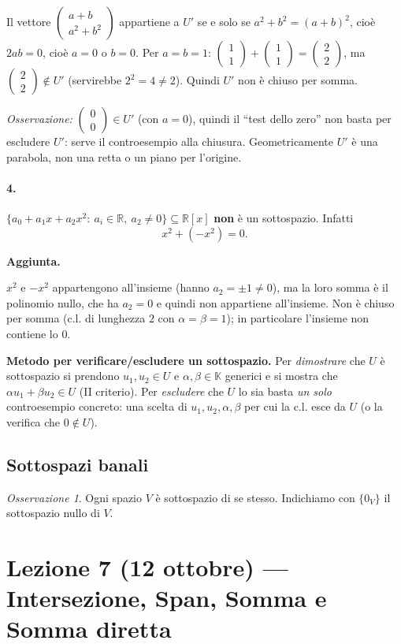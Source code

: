 \documentclass[11pt,a4paper]{article}
\newcommand{\RR}{\mathbb{R}}
\newcommand{\KK}{\mathbb{K}}
\newcommand{\vect}[2]{\begin{pmatrix}#1\\#2\end{pmatrix}}
\theoremstyle{plain}
\theoremstyle{definition}
\theoremstyle{remark}
\newtheorem{oss}[prop]{Osservazione}
\begin{document}
Il vettore $\vect{a+b}{a^2+b^2}$ appartiene a $U'$ se e solo se $a^2+b^2=(a+b)^2$, cioè $2ab=0$, cioè $a=0$ o $b=0$.
Per $a=b=1$: $\vect11+\vect11=\vect22$, ma $\vect22\notin U'$ (servirebbe $2^2=4\neq2$). Quindi $U'$ non è chiuso per somma.

\smallskip
\emph{Osservazione:} $\vect00\in U'$ (con $a=0$), quindi il ``test dello zero'' non basta per escludere $U'$: serve il controesempio alla chiusura.
Geometricamente $U'$ è una parabola, non una retta o un piano per l'origine.
\par\medskip

\paragraph{4.} $\{a_0+a_1x+a_2x^2:\ a_i\in\RR,\ a_2\ne0\}\subseteq\RR[x]$ \textbf{non} è un sottospazio.
Infatti
\[
  x^2+(-x^2)=0 .
\]

\par\medskip
\noindent\textbf{Aggiunta.}\par

$x^2$ e $-x^2$ appartengono all'insieme (hanno $a_2=\pm1\ne0$), ma la loro somma è il polinomio nullo, che ha $a_2=0$ e quindi non appartiene all'insieme. Non è chiuso per somma (c.l. di lunghezza $2$ con $\alpha=\beta=1$); in particolare l'insieme non contiene lo $0$.

\smallskip
\textbf{Metodo per verificare/escludere un sottospazio.} Per \emph{dimostrare} che $U$ è sottospazio si prendono $u_1,u_2\in U$ e $\alpha,\beta\in\KK$ generici e si mostra che $\alpha u_1+\beta u_2\in U$ (II criterio). Per \emph{escludere} che $U$ lo sia basta \emph{un solo} controesempio concreto: una scelta di $u_1,u_2,\alpha,\beta$ per cui la c.l. esce da $U$ (o la verifica che $0\notin U$).
\par\medskip

\subsection{Sottospazi banali}

\begin{oss}
Ogni spazio $V$ è sottospazio di se stesso. Indichiamo con $\{0_V\}$ il sottospazio nullo di $V$.
\end{oss}

\section{Lezione 7 (12 ottobre) --- Intersezione, Span, Somma e Somma diretta}
\end{document}

